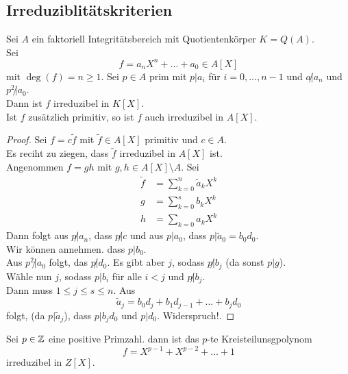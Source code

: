 	\subsection{Irreduziblitätskriterien}
	\begin{theorem}[Eisenstein]
		Sei $A$ ein faktoriell Integritätsbereich mit Quotientenkörper $K=Q(A)$.\\
		Sei
		\[f=a_nX^n+...+a_0\in A[X]\]
		mit $\deg(f)=n\geq 1$. Sei $p\in A$ prim mit $p|a_i$ für $i=0,...,n-1$ und $a\not|a_n$ und $p^2\not |a_0$.\\
		Dann ist $f$ irreduzibel in $K[X]$.\\
		Ist $f$ zusätzlich primitiv, so ist $f$ auch irreduzibel in $A[X]$.
	\end{theorem}
	\begin{proof}
		Sei $f=c\tilde f$ mit $\tilde f\in A[X]$ primitiv und $c\in A$.\\
		Es reciht zu ziegen, dass $\tilde f$ irreduzibel in $A[X]$ ist.\\
		Angenommen $f=gh$ mit $g,h\in A[X]\setminus A$. Sei
		\begin{align*}
		\tilde f&=\sum_{k=0}^{n}\tilde a_kX^k\\
		g&=\sum_{k=0}^{s}b_kX^k\\
		h&=\sum_{k=0} a_kX^k
		\end{align*}
		Dann folgt aus $p\not|a_n$, dass $p\not|c$ und aus $p|a_0$, dass $p|\tilde a_0=b_0d_0$.\\
		Wir können annehmen. dass $p|b_0$.\\
		Aus $p^2\not |a_0$ folgt, das $p\not| d_0$. Es gibt aber $j$, sodass $p\not|b_j$ (da sonst $p|g$).\\
		Wähle nun $j$, sodass $p|b_i$ für alle $i<j$ und $p\not| b_j$.\\
		Dann muss $1\leq j\leq s\leq n$. Aus 
		\[\tilde a_j=b_0d_j+b_1d_{j-1}+...+b_jd_0\]
		folgt, (da $p|\tilde a_j$), dass $p|b_jd_0$ und $p|d_0$. Widerspruch!.
	\end{proof}

	\begin{exm}
		Sei $p\in\mathbb{Z}$ eine positive Primzahl. dann ist das $p$-te Kreisteilunsgpolynom
		\[f=X^{p-1}+X^{p-2}+...+1\]
		irreduzibel in $Z[X]$.
	\end{exm}

